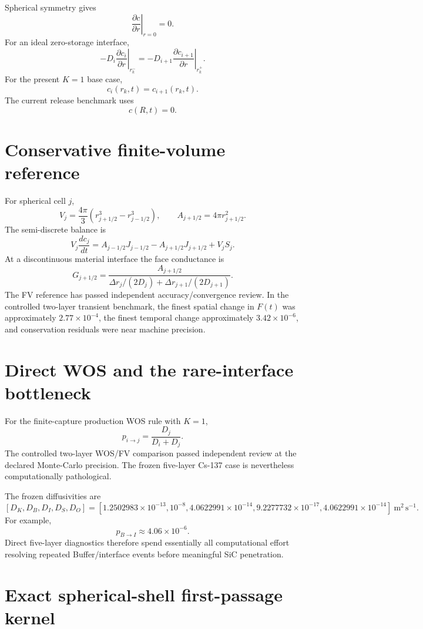 \documentclass[11pt]{article}
\begin{document}
Spherical symmetry gives
\[
\boxed{\left.\frac{\partial c}{\partial r}\right|_{r=0}=0}.
\]
For an ideal zero-storage interface,
\[
\boxed{
-D_i\left.\frac{\partial c_i}{\partial r}\right|_{r_k^-}
=
-D_{i+1}\left.\frac{\partial c_{i+1}}{\partial r}\right|_{r_k^+}
}.
\]
For the present $K=1$ base case,
\[
\boxed{c_i(r_k,t)=c_{i+1}(r_k,t)}.
\]
The current release benchmark uses
\[
\boxed{c(R,t)=0}.
\]

\section{Conservative finite-volume reference}

For spherical cell $j$,
\[
V_j=\frac{4\pi}{3}
\left(r_{j+1/2}^3-r_{j-1/2}^3\right),
\qquad
A_{j+1/2}=4\pi r_{j+1/2}^2.
\]
The semi-discrete balance is
\[
V_j\frac{dc_j}{dt}
=
A_{j-1/2}J_{j-1/2}
-
A_{j+1/2}J_{j+1/2}
+
V_jS_j.
\]
At a discontinuous material interface the face conductance is
\[
\boxed{
G_{j+1/2}
=
\frac{A_{j+1/2}}
{\Delta r_j/(2D_j)+\Delta r_{j+1}/(2D_{j+1})}
}.
\]
The FV reference has passed independent accuracy/convergence review. In the controlled two-layer transient benchmark, the finest spatial change in $F(t)$ was approximately $2.77\times10^{-4}$, the finest temporal change approximately $3.42\times10^{-6}$, and conservation residuals were near machine precision.

\section{Direct WOS and the rare-interface bottleneck}

For the finite-capture production WOS rule with $K=1$,
\[
\boxed{
p_{i\rightarrow j}
=
\frac{D_j}{D_i+D_j}
}.
\]
The controlled two-layer WOS/FV comparison passed independent review at the declared Monte-Carlo precision. The frozen five-layer Cs-137 case is nevertheless computationally pathological.

The frozen diffusivities are
\[
[D_K,D_B,D_I,D_S,D_O]
=
[1.2502983\times10^{-13},10^{-8},4.0622991\times10^{-14},
9.2277732\times10^{-17},4.0622991\times10^{-14}]
\ \mathrm{m^2\,s^{-1}}.
\]
For example,
\[
p_{B\rightarrow I}\approx4.06\times10^{-6}.
\]
Direct five-layer diagnostics therefore spend essentially all computational effort resolving repeated Buffer/interface events before meaningful SiC penetration.

\section{Exact spherical-shell first-passage kernel}
\end{document}
